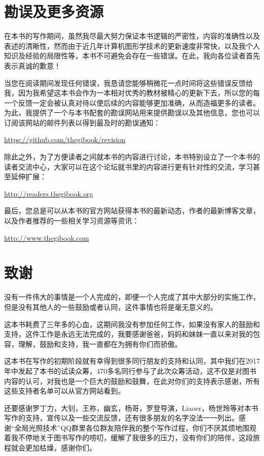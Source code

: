\section*{勘误及更多资源}
在本书的写作期间，虽然我尽最大努力保证本书逻辑的严密性，内容的准确性以及表述的清晰性，然而由于近几年计算机图形学技术的更新速度非常快，以及我个人知识及经验的局限性等，本书不可避免会存在一些错误。在此，我向各位读者首先表示真诚的歉意！

当您在阅读期间发现任何错误，我恳请您能够稍微花一点时间将这些错误反馈给我，因为我希望这本书会作为一本相对优秀的教材被精心的更新下去，所以您的每一个反馈一定会被认真对待以使后续的内容能够更加准确，从而造福更多的读者。为此，我提供了一个与本书配套的勘误网站用来提供勘误以及其他信息，您也可以订阅该网站的邮件列表以得到最及时的勘误通知：

\url{https://github.com/thegibook/revision}

除此之外，为了方便读者之间就本书的内容进行讨论，本书特别设立了一个本书的读者交流中心，大家可以在这个论坛就书里的内容进行更有针对性的交流，学习甚至延伸扩展：

\url{http://readers.thegibook.org}

最后，您总是可以从本书的官方网站获得本书的最新动态，作者的最新博客文章，以及作者推荐的一些相关学习资源等资讯：

\url{http://www.thegibook.com}




\section*{致谢}
没有一件伟大的事情是一个人完成的，即便一个人完成了其中大部分的实施工作，但是没有其他人的一些鼓励或者认同，这件事情也将是毫无意义的。

这本书耗费了三年多的心血，这期间我没有参加任何工作，如果没有家人的鼓励和支持，这件工作是永远无法完成的，我要感谢爸爸，妈妈和妹妹一直以来对我的包容，理解，鼓励和支持，我一直都在为拥有你们而骄傲。

这本书在写作的初期阶段就有幸得到很多同行朋友的支持和认同，其中我们在2017年中发起了本书的试读众筹，470多名同行参与了此次众筹活动，这不仅是对图书内容的认可，对我也是一个巨大的鼓励和鼓舞，在此对你们的支持表示感谢，所有这些支持者名单可以从官方网站看到。

还要感谢罗丁力，大钊，王祢，幽玄，杨哥，罗登导演，Liaoer，杨世玲等对本书写作的支持，宣传以及一些交流反馈，还有很多朋友的名字没法一一列出。感谢“全局光照技术”QQ群里各位群友陪伴我的整个写作过程，你们不厌其烦地围观着我不停地关于图书写作的唠叨，缓解了我很多的压力，没有你们的陪伴，这段旅程就会更加枯燥，感谢你们。

